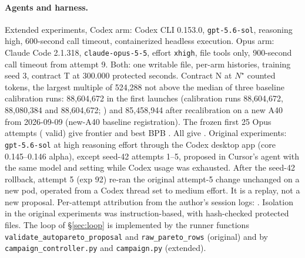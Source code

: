 \documentclass{article}
\begin{document}
\paragraph{Agents and harness.} Extended experiments, Codex arm: Codex CLI 0.153.0, \texttt{gpt-5.6-sol}, reasoning high, 600-second call timeout, containerized headless execution. Opus arm: Claude Code 2.1.318, \texttt{claude-opus-5-5}, effort \texttt{xhigh}, file tools only, 900-second call timeout from attempt 9. Both: one writable file, per-arm histories, training seed 3, contract T at 300.000 protected seconds. Contract N at $N^\star$ counted tokens, the largest multiple of 524,288 not above the median of three baseline calibration runs: 88,604,672 in the first launches (calibration runs 88,604,672, 88,080,384 and 88,604,672; ) and 85,458,944 after recalibration on a new A40 from 2026-09-09 (new-A40 baseline registration). The frozen first 25 Opus attempts (\CROpValidFrozen{} valid) give frontier \CROpFrontierFrozen{} and best BPB \CROpBestFrozen. All \CROpAttempts{} give \CROpFrontierExtended. Original experiments: \texttt{gpt-5.6-sol} at high reasoning effort through the Codex desktop app (core 0.145--0.146 alpha), except seed-42 attempts 1--5, proposed in Cursor's agent with the same model and setting while Codex usage was exhausted. After the seed-42 rollback, attempt 5 (exp 92) re-ran the original attempt-5 change unchanged on a new pod, operated from a Codex thread set to medium effort. It is a replay, not a new proposal. Per-attempt attribution from the author's session logs: . Isolation in the original experiments was instruction-based, with hash-checked protected files. The loop of \S\ref{sec:loop} is implemented by the runner functions \texttt{validate\_autopareto\_proposal} and \texttt{raw\_pareto\_rows} (original) and by \texttt{campaign\_controller.py} and \texttt{campaign.py} (extended).
\end{document}
